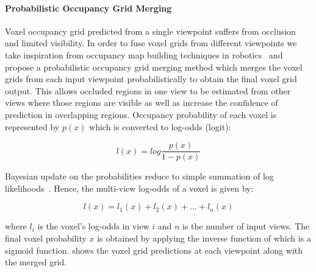 \paragraph{Probabilistic Occupancy Grid Merging}\vspace{-4mm}
Voxel occupancy grid predicted from a single viewpoint suffers from occlusion and limited visibility.
In order to fuse voxel grids from different viewpoints we take inspiration from occupancy map building techniques in robotics~\cite{grisetti2007improved,konolige1997improved} and propose a probabilistic occupancy grid merging method which merges the voxel grids from each input viewpoint probabilistically to obtain the final voxel grid output.
This allows occluded regions in one view to be estimated from other views where those regions are visible as well as increase the confidence of prediction in overlapping regions.
Occupancy probability of each voxel is represented by $p(x)$ which is converted to log-odds (logit):

\begin{equation}
    l(x) = log \frac{p(x)}{1 - p(x)}
    \label{equ:logodds}
\end{equation}

Bayesian update on the probabilities reduce to simple summation of log likelihoods~\cite{konolige1997improved}. Hence, the multi-view log-odds of a voxel is given by:

\begin{equation}
    l(x) = l_1(x) + l_2(x) + ... + l_n(x)
    \label{equ:logodds_sum}
\end{equation}

\noindent where $l_i$ is the voxel's log-odds in view $i$ and $n$ is the number of input views.
The final voxel probability $x$ is obtained by applying the inverse function of  which is a sigmoid function.
 shows the voxel grid predictions at each viewpoint along with the merged grid.

